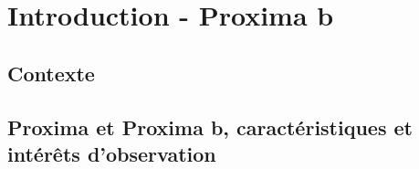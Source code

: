 \section{Introduction - Proxima b}

\subsection{Contexte}


\subsection{Proxima et Proxima b, caractéristiques et intérêts d'observation}







